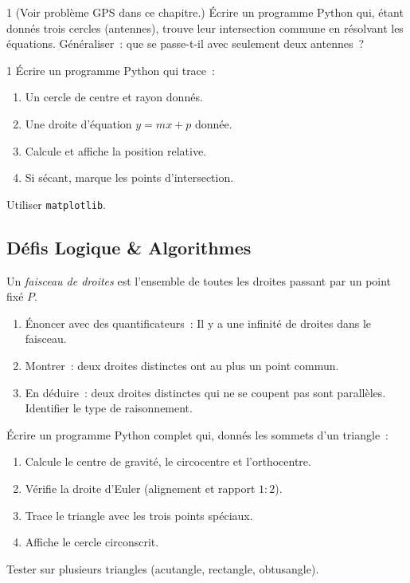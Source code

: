 \begin{bilan}
\begin{probleme}{1}
(Voir probl\`eme GPS dans ce chapitre.)
\'Ecrire un programme Python qui, \'etant donn\'es trois cercles (antennes),
trouve leur intersection commune en r\'esolvant les \'equations.
G\'en\'eraliser~: que se passe-t-il avec seulement deux antennes~?
\end{probleme}

\begin{probleme}{1}
\'Ecrire un programme Python qui trace~:
\begin{enumerate}
  \item Un cercle de centre et rayon donn\'es.
  \item Une droite d'\'equation $y=mx+p$ donn\'ee.
  \item Calcule et affiche la position relative.
  \item Si s\'ecant, marque les points d'intersection.
\end{enumerate}
Utiliser \texttt{matplotlib}.
\end{probleme}

\subsection*{D\'efis Logique \& Algorithmes}

\begin{challenge}
Un \emph{faisceau de droites} est l'ensemble de toutes les droites
passant par un point fix\'e $P$.
\begin{enumerate}
  \item \'Enoncer avec des quantificateurs~:
        \og Il y a une infinit\'e de droites dans le faisceau.\fg
  \item Montrer~: deux droites distinctes ont au plus un point commun.
  \item En d\'eduire~: deux droites distinctes qui ne se coupent pas sont parall\`eles.
        Identifier le type de raisonnement.
\end{enumerate}
\end{challenge}

\begin{challenge}
\'Ecrire un programme Python complet qui, donn\'es les sommets d'un triangle~:
\begin{enumerate}
  \item Calcule le centre de gravité, le circocentre et l'orthocentre.
  \item V\'erifie la droite d'Euler (alignement et rapport $1:2$).
  \item Trace le triangle avec les trois points sp\'eciaux.
  \item Affiche le cercle circonscrit.
\end{enumerate}
Tester sur plusieurs triangles (acutangle, rectangle, obtusangle).
\end{challenge}

\end{bilan}
